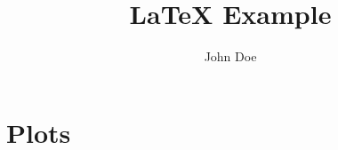 \documentclass[border=10pt]{article}
\title{\LaTeX{} Example}
\author{John Doe}
\begin{document}
\maketitle

\section{Plots}
\begin{figure}[htbp]
    \centering
    
\end{figure}
\begin{figure}[htbp]
    \centering
    
\end{figure}
\begin{figure}[htbp]
    \centering
    
\end{figure}
\begin{figure}[htbp]
    \centering
     \\
\end{figure}
\end{document}
